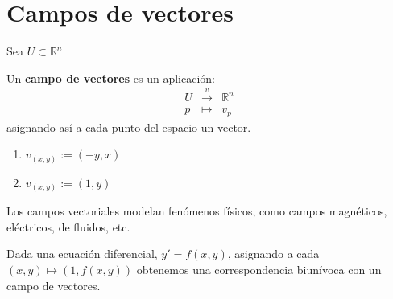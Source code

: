 \section{Campos de vectores}
Sea $U \subset \mathbb{R}^n$
\begin{defi}
    Un \textbf{campo de vectores} es un aplicación:
    $$\begin{array}{rcl}
         U & \overset{v}{\longrightarrow} & \mathbb{R}^n \\
         p & \longmapsto & v_p 
    \end{array}$$
asignando así a cada punto del espacio un vector.    
\end{defi}
\begin{ejes} \: 
\begin{enumerate} 
    \item $v_{(x,y)}:=(-y,x)$ 
    \item $v_{(x,y)}:=(1,y)$
\end{enumerate}
\end{ejes}
\begin{nota}
Los campos vectoriales modelan fenómenos físicos, como campos magnéticos, eléctricos, de fluidos, etc.
\end{nota}
\begin{obs}
Dada una ecuación diferencial, $y'=f(x,y)$, asignando a cada $(x,y)\longmapsto (1,f(x,y))$ obtenemos una correspondencia biunívoca con un campo de vectores.
\end{obs}
